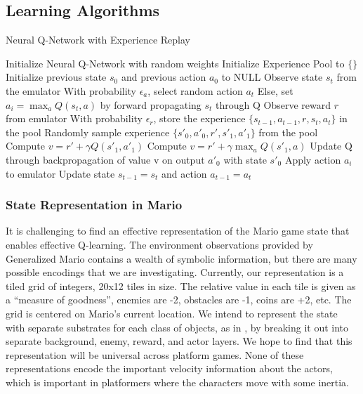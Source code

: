 \documentclass{article}
\begin{document}
\subsection{Learning Algorithms}

\begin{algorithm}[tb]
   \caption{Neural Q-Network with Experience Replay}
   \label{alg:q-learn}
\begin{algorithmic}
   \STATE Initialize Neural Q-Network with random weights
   \STATE Initialize Experience Pool to $\{ \}$
   \STATE Initialize previous state $s_0$ and previous action $a_0$ to NULL
   \STATE Observe state $s_t$ from the emulator
   \STATE With probability $\epsilon_a$, select random action $a_t$
   \STATE Else, set $a_i = \max_a Q(s_t, a)$ by forward propagating $s_t$ through Q
   \STATE Observe reward $r$ from emulator
   \STATE With probability $\epsilon_r$, store the experience $\{s_{t-1}, a_{t-1}, r, s_t, a_t \}$ in the pool
   \ENDIF
   \STATE Randomly sample experience $\{s'_0, a'_0, r', s'_1, a'_1 \}$ from the pool
   \STATE Compute $v = r' + \gamma Q(s'_1, a'_1)$
   \ELSE
   \STATE Compute $v = r' + \gamma \max_a Q(s'_1, a)$
   \ENDIF
   \STATE Update Q through backpropagation of value v on output $a'_0$ with state $s'_0$
   \ENDFOR
   \STATE Apply action $a_i$ to emulator
   \STATE Update state $s_{t-1} = s_t$ and action $a_{t-1} = a_t$
   \ENDFOR
   \ENDFOR
\end{algorithmic}
\end{algorithm}

\subsubsection{State Representation in Mario}
It is challenging to find an effective representation of the Mario game state that enables effective Q-learning. The environment observations provided by Generalized Mario contains a wealth of symbolic information, but there are many possible encodings that we are investigating. Currently, our representation is a tiled grid of integers, 20x12 tiles in size. The relative value in each tile is given as a ``measure of goodness'', enemies are -2, obstacles are -1, coins are +2, etc. The grid is centered on Mario's current location. We intend to represent the state with separate substrates for each class of objects, as in \cite{Hauskneck13}, by breaking it out into separate background, enemy, reward, and actor layers. We hope to find that this representation will be universal across platform games. None of these representations encode the important velocity information about the actors, which is important in platformers where the characters move with some inertia.
\end{document}
